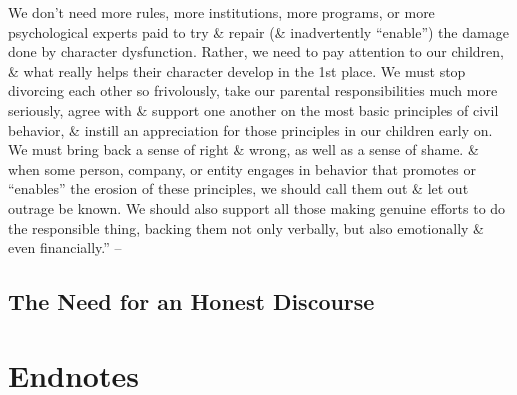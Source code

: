 \documentclass{article}
\numberwithin{equation}{section}
\begin{document}
We don't need more rules, more institutions, more programs, or more psychological experts paid to try \& repair (\& inadvertently ``enable'') the damage done by character dysfunction. Rather, we need to pay attention to our children, \& what really helps their character develop in the 1st place. We must stop divorcing each other so frivolously, take our parental responsibilities much more seriously, agree with \& support one another on the most basic principles of civil behavior, \& instill an appreciation for those principles in our children early on. We must bring back a sense of right \& wrong, as well as a sense of shame. \& when some person, company, or entity engages in behavior that promotes or ``enables'' the erosion of these principles, we should call them out \& let out outrage be known. We should also support all those making genuine efforts to do the responsible thing, backing them not only verbally, but also emotionally \& even financially.'' -- \cite[pp. 239--241]{Simon2011}

\subsection{The Need for an Honest Discourse}


\section*{Endnotes}


\printbibliography[heading=bibintoc]
	
\end{document}

